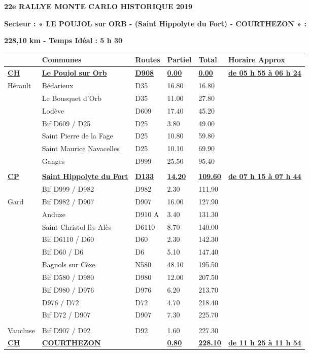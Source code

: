 \documentclass{article}%
\begin{document}
%
\normalsize%
\begin{center} \textbf{\LARGE{22e RALLYE MONTE CARLO HISTORIQUE 2019}} \end{center}%
\begin{flushleft} \textbf{Secteur : « LE POUJOL sur ORB - (Saint Hippolyte du Fort) - COURTHEZON » :
} \end{flushleft}%
\begin{flushright} \textbf{228,10 km - Temps Idéal : 5 h 30} \end{flushright}%
\begin{longtable}{p{2.25cm}|p{5.7cm}|p{3.0cm}|p{1.5cm}|p{1.5cm}|p{3.5cm}}%
\hline%
&Communes&Routes&Partiel&Total&Horaire Approx\\%
\hline%
\endhead%
\endfoot%
\endlastfoot%
\textbf{\underline{﻿CH }}&\textbf{\underline{Le Poujol sur Orb}}&\textbf{\underline{D908}}&\textbf{\underline{0.00}}&\textbf{\underline{0.00}}&\textbf{\underline{de 05 h 55 à 06 h 24}}\\%
Hérault&Bédarieux&D35&16.80&16.80& \\%
 &Le Bousquet d'Orb&D35&11.00&27.80& \\%
 &Lodève&D609&17.40&45.20& \\%
 &Bif D609 / D25&D25&3.80&49.00& \\%
 &Saint Pierre de la Fage &D25&10.80&59.80& \\%
 &Saint Maurice Navacelles &D25&10.10&69.90& \\%
 &Ganges&D999&25.50&95.40& \\%
\hline& & & & & \\%
\textbf{\underline{CP}}&\textbf{\underline{Saint Hippolyte du Fort}}&\textbf{\underline{D133}}&\textbf{\underline{14.20}}&\textbf{\underline{109.60}}&\textbf{\underline{de 07 h 15 à 07 h 44}}\\%
 &Bif D999 / D982&D982&2.30&111.90& \\%
Gard&Bif D982 / D907&D907&16.00&127.90& \\%
 &Anduze&D910 A&3.40&131.30& \\%
 &Saint Christol lès Alès&D6110&8.70&140.00& \\%
 &Bif D6110 / D60&D60 &2.30&142.30& \\%
 &Bif D60 / D6&D6&5.10&147.40& \\%
 &Bagnols sur Cèze&N580&48.10&195.50& \\%
 &Bif D580 / D980&D980&12.00&207.50& \\%
 &Bif D980 / D976&D976&6.20&213.70& \\%
 &D976 / D72&D72&4.70&218.40& \\%
 &Bif D72 / D907&D907&7.30&225.70& \\%
\hline& & & & & \\%
Vaucluse&Bif D907 / D92&D92&1.60&227.30& \\%
\textbf{\underline{      CH}}&\textbf{\underline{COURTHEZON}}& &\textbf{\underline{0.80}}&\textbf{\underline{228.10}}&\textbf{\underline{de 11 h 25 à 11 h 54}}\\%
\hline%
\end{longtable}%
\begin{flushleft} \textit{} \end{flushleft}%
\end{document}
